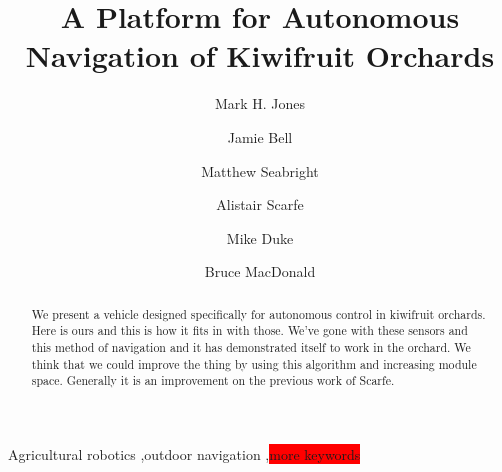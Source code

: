 \documentclass[preprint,authoryear,12pt]{elsarticle}
\begin{document}
\begin{frontmatter}



\title{A Platform for Autonomous Navigation of Kiwifruit Orchards}



\author[UoW]{Mark H. Jones}

\author[UoA]{Jamie Bell}
\author[UoW]{Matthew Seabright}
\author[RPL]{Alistair Scarfe}
\author[UoW]{Mike Duke}
\author[UoA]{Bruce MacDonald}

\address[UoW]{School of Engineering, University of Waikato, Hamilton, New Zealand}
\address[UoA]{Faculty of Engineering, University of Auckland, Auckland, New Zealand}
\address[RPL]{Robotics Plus Ltd, Newnham Innovation Park, Tauranga, New Zealand}

\begin{abstract}

    We present a vehicle designed specifically for autonomous control in kiwifruit orchards.
    Here is ours and this is how it fits in with those.
    We've gone with these sensors and this method of navigation and it has demonstrated itself to work in the orchard.
    We think that we could improve the thing by using this algorithm and increasing module space.
    Generally it is an improvement on the previous work of Scarfe.

\end{abstract}

\begin{keyword}

    Agricultural robotics \sep outdoor navigation \sep \colorbox{red}{more keywords}
\end{keyword}

\end{frontmatter}
\end{document}
